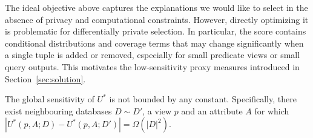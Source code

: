 The ideal objective above captures the explanations we would like to select in the absence of privacy and computational constraints.
However, directly optimizing it is problematic for differentially private selection.
In particular, the score contains conditional distributions and coverage terms that may change significantly when a single tuple is added or removed, especially for small predicate views or small query outputs.
This motivates the low-sensitivity proxy measures introduced in Section~\ref{sec:solution}.

\begin{proposition}
\label{prop:ideal-utility-sensitivity}
The global sensitivity of $U^*$ is not bounded by any constant.
Specifically, there exist neighbouring databases $D\sim D'$, a view $p$ and an attribute $A$ for which
$|U^*(p,A;D)-U^*(p,A;D')| = \Omega(|D|^2)$.
\end{proposition}

